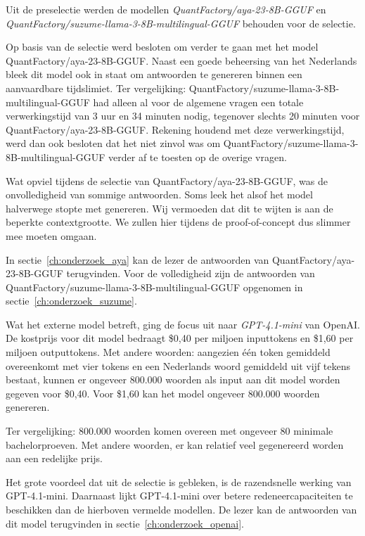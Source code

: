 Uit de preselectie werden de modellen \emph{QuantFactory/aya-23-8B-GGUF} en \emph{QuantFactory/suzume-llama-3-8B-multilingual-GGUF} behouden voor de selectie.

Op basis van de selectie werd besloten om verder te gaan met het model QuantFactory/aya-23-8B-GGUF. Naast een goede beheersing van het Nederlands bleek dit model ook in staat om antwoorden te genereren binnen een aanvaardbare tijdslimiet. Ter vergelijking: QuantFactory/suzume-llama-3-8B-multilingual-GGUF had alleen al voor de algemene vragen een totale verwerkingstijd van 3 uur en 34 minuten nodig, tegenover slechts 20 minuten voor QuantFactory/aya-23-8B-GGUF. Rekening houdend met deze verwerkingstijd, werd dan ook besloten dat het niet zinvol was om QuantFactory/suzume-llama-3-8B-multilingual-GGUF verder af te toesten op de overige vragen.

Wat opviel tijdens de selectie van QuantFactory/aya-23-8B-GGUF, was de onvolledigheid van sommige antwoorden. Soms leek het alsof het model halverwege stopte met genereren. Wij vermoeden dat dit te wijten is aan de beperkte contextgrootte. We zullen hier tijdens de proof-of-concept dus slimmer mee moeten omgaan.

In sectie~\ref{ch:onderzoek_aya} kan de lezer de antwoorden van QuantFactory/aya-23-8B-GGUF terugvinden. Voor de volledigheid zijn de antwoorden van QuantFactory/suzume-llama-3-8B-multilingual-GGUF opgenomen in sectie~\ref{ch:onderzoek_suzume}.

Wat het externe model betreft, ging de focus uit naar \emph{GPT-4.1-mini} van OpenAI. De kostprijs voor dit model bedraagt \$0,40 per miljoen inputtokens en \$1,60 per miljoen outputtokens. Met andere woorden: aangezien één token gemiddeld overeenkomt met vier tokens en een Nederlands woord gemiddeld uit vijf tekens bestaat, kunnen er ongeveer 800.000 woorden als input aan dit model worden gegeven voor \$0,40. Voor \$1,60 kan het model ongeveer 800.000 woorden genereren.

Ter vergelijking: 800.000 woorden komen overeen met ongeveer 80 minimale bachelorproeven. Met andere woorden, er kan relatief veel gegenereerd worden aan een redelijke prijs.

Het grote voordeel dat uit de selectie is gebleken, is de razendsnelle werking van GPT-4.1-mini. Daarnaast lijkt GPT-4.1-mini over betere redeneercapaciteiten te beschikken dan de hierboven vermelde modellen. De lezer kan de antwoorden van dit model terugvinden in sectie~\ref{ch:onderzoek_openai}.

